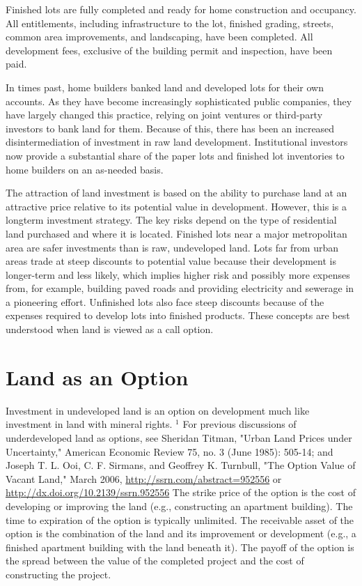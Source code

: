 \documentclass[11pt]{article}
\begin{document}
Finished lots are fully completed and ready for home construction and occupancy. All entitlements, including infrastructure to the lot, finished grading, streets, common area improvements, and landscaping, have been completed. All development fees, exclusive of the building permit and inspection, have been paid.

In times past, home builders banked land and developed lots for their own accounts. As they have become increasingly sophisticated public companies, they have largely changed this practice, relying on joint ventures or third-party investors to bank land for them. Because of this, there has been an increased disintermediation of investment in raw land development. Institutional investors now provide a substantial share of the paper lots and finished lot inventories to home builders on an as-needed basis.

The attraction of land investment is based on the ability to purchase land at an attractive price relative to its potential value in development. However, this is a longterm investment strategy. The key risks depend on the type of residential land purchased and where it is located. Finished lots near a major metropolitan area are safer investments than is raw, undeveloped land. Lots far from urban areas trade at steep discounts to potential value because their development is longer-term and less likely, which implies higher risk and possibly more expenses from, for example, building paved roads and providing electricity and sewerage in a pioneering effort. Unfinished lots also face steep discounts because of the expenses required to develop lots into finished products. These concepts are best understood when land is viewed as a call option.

\section*{Land as an Option}
Investment in undeveloped land is an option on development much like investment in land with mineral rights. ${ }^{1}$ For previous discussions of underdeveloped land as options, see Sheridan Titman, "Urban Land Prices under Uncertainty," American Economic Review 75, no. 3 (June 1985): 505-14; and Joseph T. L. Ooi, C. F. Sirmans, and Geoffrey K. Turnbull, "The Option Value of Vacant Land," March 2006, \href{http://ssrn.com/abstract=952556}{http://ssrn.com/abstract=952556} or \href{http://dx.doi.org/10.2139/ssrn.952556}{http://dx.doi.org/10.2139/ssrn.952556} The strike price of the option is the cost of developing or improving the land (e.g., constructing an apartment building). The time to expiration of the option is typically unlimited. The receivable asset of the option is the combination of the land and its improvement or development (e.g., a finished apartment building with the land beneath it). The payoff of the option is the spread between the value of the completed project and the cost of constructing the project.
\end{document}
